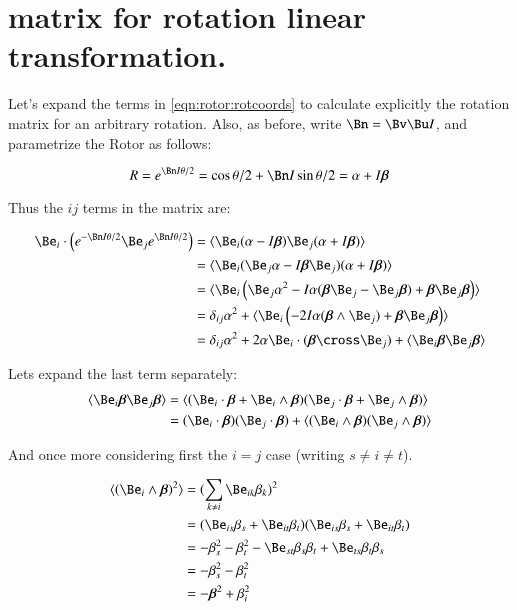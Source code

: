 \section{matrix for rotation linear transformation. }

Let's expand the terms in \ref{eqn:rotor:rotcoords} to calculate explicitly the rotation matrix for an arbitrary
rotation.  Also, as before, write $\Bn = \Bv\Bu I$, and parametrize the Rotor as follows:

\[
R = e^{\Bn I \theta/2} = \cos{\theta/2} + \Bn I \sin{\theta/2} = \alpha + I\Bbeta
\]

Thus the $ij$ terms in the matrix are:

\begin{align*}
\Be_i \cdot \left(e^{-\Bn I \theta/2} \Be_j e^{\Bn I \theta/2}\right)
&= \langle{ \Be_i (\alpha -I\Bbeta) \Be_j (\alpha +I\Bbeta) } \rangle \\
&= \langle{ \Be_i (\Be_j \alpha -I\Bbeta\Be_j) (\alpha +I\Bbeta) } \rangle \\
&= \langle{ \Be_i \left( \Be_j \alpha^2 -I\alpha(\Bbeta\Be_j - \Be_j\Bbeta) + \Bbeta\Be_j\Bbeta \right) } \rangle \\
&= \delta_{ij}\alpha^2 + \langle{ \Be_i \left( -2I\alpha(\Bbeta \wedge \Be_j) + \Bbeta\Be_j\Bbeta \right) } \rangle \\
&= \delta_{ij}\alpha^2 + 2\alpha \Be_i \cdot (\Bbeta \cross \Be_j) + \langle{ \Be_i \Bbeta \Be_j \Bbeta } \rangle \\
\end{align*}

Lets expand the last term separately:
\begin{align*}
\langle{ \Be_i \Bbeta \Be_j \Bbeta } \rangle 
&= \langle{ ( \Be_i \cdot \Bbeta + \Be_i \wedge \Bbeta) ( \Be_j \cdot \Bbeta + \Be_j \wedge \Bbeta) } \rangle  \\
&= (\Be_i \cdot \Bbeta)(\Be_j \cdot \Bbeta) + \langle{ (\Be_i \wedge \Bbeta) ( \Be_j \wedge \Bbeta) } \rangle  \\
\end{align*}

And once more considering first the $i=j$ case (writing $s \ne i \ne t$).

\begin{align*}
\langle{ (\Be_i \wedge \Bbeta)^2 }\rangle 
&= (\sum_{k \ne i}{ \Be_{ik} \beta_k})^2 \\
&= ( \Be_{is} \beta_s + \Be_{it} \beta_t ) ( \Be_{is} \beta_s + \Be_{it} \beta_t ) \\
&= -\beta_s^2 -\beta_t^2 -  \Be_{st} \beta_s \beta_t + \Be_{ts} \beta_t \beta_s  \\
&= -\beta_s^2 -\beta_t^2 \\
&= -\Bbeta^2 + \beta_i^2 \\
\end{align*}

